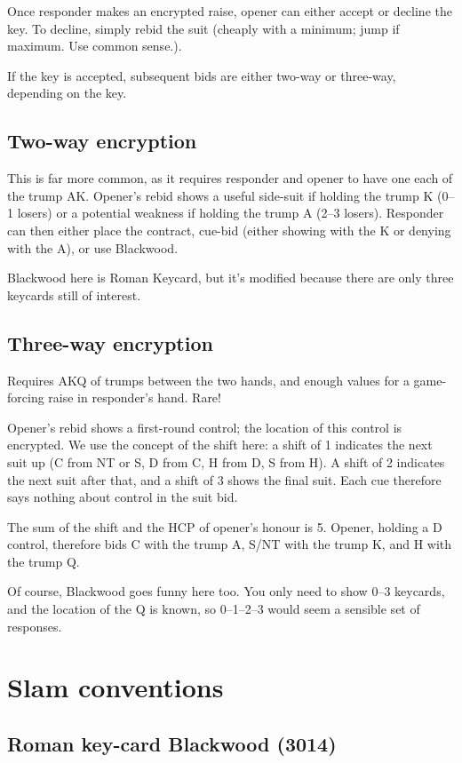 \documentclass[a4paper,12pt]{article}
\begin{document}
Once responder makes an encrypted raise, opener can either accept or decline
the key.  To decline, simply rebid the suit (cheaply with a minimum; jump if
maximum.  Use common sense.).

If the key is accepted, subsequent bids are either two-way or three-way, depending on the key.

\subsection{Two-way encryption}

This is far more common, as it requires responder and opener to have one each
of the trump AK. Opener's rebid shows a useful side-suit if holding the trump
K (0--1 losers) or a potential weakness if holding the trump A (2--3 losers).
Responder can then either place the contract, cue-bid (either showing with the
K or denying with the A), or use Blackwood.

Blackwood here is Roman Keycard, but it's modified because there are only three keycards
still of interest.

\subsection{Three-way encryption}

Requires AKQ of trumps between the two hands, and enough values for a
game-forcing raise in responder's hand.  Rare!

Opener's rebid shows a first-round control; the location of this control is
encrypted.  We use the concept of the shift here: a shift of 1 indicates the
next suit up (C from NT or S, D from C, H from D, S from H).  A shift of 2
indicates the next suit after that, and a shift of 3 shows the final suit.
Each cue therefore says nothing about control in the suit bid.

The sum of the shift and the HCP of opener's honour is 5.  Opener, holding a D
control, therefore bids C with the trump A, S/NT with the trump K, and H with
the trump Q.

Of course, Blackwood goes funny here too.  You only need to show 0--3 keycards,
and the location of the Q is known, so 0--1--2--3 would seem a sensible set
of responses.

\section{Slam conventions}

\subsection{Roman key-card Blackwood (3014)}
\end{document}
